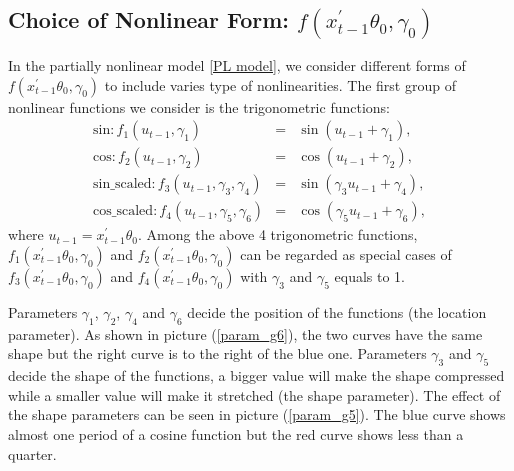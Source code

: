 \documentclass[a4paper,12pt,times,numbered,print,index]{report}
\numberwithin{equation}{section}
\begin{document}
\subsection{Choice of Nonlinear Form: $f\left(x_{t-1}^{\prime }\theta _{0},\gamma _{0}\right)$}
	In the partially nonlinear model \ref{PL model}, we consider different forms of $f\left(x_{t-1}^{\prime }\theta _{0},\gamma _{0}\right)$ to include varies type of nonlinearities. The first group of nonlinear functions we consider is the trigonometric functions: 
	\begin{eqnarray*}
		\text{sin}: f_{1}\left( u_{t-1},\gamma _{1}\right) &=&\sin \left( u_{t-1}+\gamma_{1}\right),  \\
		\text{cos}: f_{2}\left( u_{t-1},\gamma _{2}\right) &=&\cos \left( u_{t-1}+\gamma_{2}\right), \\
		\text{sin\_scaled}: f_{3}\left( u_{t-1},\gamma_{3}, \gamma_{4}\right) &=&\sin \left( \gamma_{3}u_{t-1}+\gamma_{4}\right),  \\
		\text{cos\_scaled}: f_{4}\left( u_{t-1},\gamma_{5}, \gamma_{6}\right) &=&\cos \left( \gamma_{5}u_{t-1}+\gamma_{6}\right),
	\end{eqnarray*} 
	where $u_{t-1} =  x_{t-1}^{\prime }\theta _{0}$.
	Among the above 4 trigonometric functions, $f_{1} \left(x_{t-1}^{\prime }\theta _{0},\gamma _{0}\right)$ and $f_{2} \left(x_{t-1}^{\prime }\theta _{0},\gamma _{0}\right)$ can be regarded as special cases of $f_{3}\left(x_{t-1}^{\prime }\theta _{0},\gamma _{0}\right)$ and $f_{4} \left(x_{t-1}^{\prime }\theta _{0},\gamma _{0}\right)$ with $\gamma_{3}$ and $\gamma_{5}$ equals to 1. 
	
	Parameters $\gamma_{1}$, $\gamma_{2}$, $\gamma_{4}$ and $\gamma_{6}$ decide the position of the functions (the location parameter). As shown in picture (\ref{param_g6}), the two curves have the same shape but the right curve is to the right of the blue one. Parameters $\gamma_{3}$ and $\gamma_{5}$ decide the shape of the functions, a bigger value will make the shape compressed while a smaller value will make it stretched (the shape parameter). The effect of the shape parameters can be seen in picture (\ref{param_g5}). The blue curve shows almost one period of a cosine function but the red curve shows less than a quarter.
	
\end{document}
